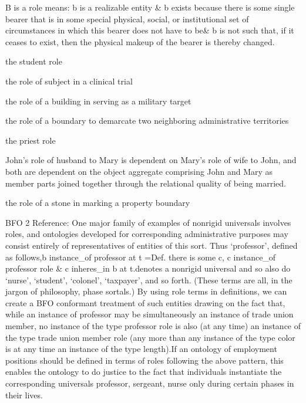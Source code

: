 \documentclass[letterpaper,10pt,english]{sphinxmanual}
\begin{document}
\begin{sphinxShadowBox}

\sphinxAtStartPar
B is a role means: b is a realizable entity \& b exists because there is some single bearer that is in some special physical, social, or institutional set of circumstances in which this bearer does not have to be\& b is not such that, if it ceases to exist, then the physical make\sphinxhyphen{}up of the bearer is thereby changed.
\end{sphinxShadowBox}

\begin{sphinxShadowBox}

\sphinxAtStartPar
the student role

\sphinxAtStartPar
the role of subject in a clinical trial

\sphinxAtStartPar
the role of a building in serving as a military target

\sphinxAtStartPar
the role of a boundary to demarcate two neighboring administrative territories

\sphinxAtStartPar
the priest role

\sphinxAtStartPar
John’s role of husband to Mary is dependent on Mary’s role of wife to John, and both are dependent on the object aggregate comprising John and Mary as member parts joined together through the relational quality of being married.

\sphinxAtStartPar
the role of a stone in marking a property boundary
\end{sphinxShadowBox}

\begin{sphinxShadowBox}

\sphinxAtStartPar
BFO 2 Reference: One major family of examples of non\sphinxhyphen{}rigid universals involves roles, and ontologies developed for corresponding administrative purposes may consist entirely of representatives of entities of this sort. Thus ‘professor’, defined as follows,b instance\_of professor at t =Def. there is some c, c instance\_of professor role \& c inheres\_in b at t.denotes a non\sphinxhyphen{}rigid universal and so also do ‘nurse’, ‘student’, ‘colonel’, ‘taxpayer’, and so forth. (These terms are all, in the jargon of philosophy, phase sortals.) By using role terms in definitions, we can create a BFO conformant treatment of such entities drawing on the fact that, while an instance of professor may be simultaneously an instance of trade union member, no instance of the type professor role is also (at any time) an instance of the type trade union member role (any more than any instance of the type color is at any time an instance of the type length).If an ontology of employment positions should be defined in terms of roles following the above pattern, this enables the ontology to do justice to the fact that individuals instantiate the corresponding universals \textendash{}  professor, sergeant, nurse \textendash{} only during certain phases in their lives.
\end{sphinxShadowBox}
\end{document}
